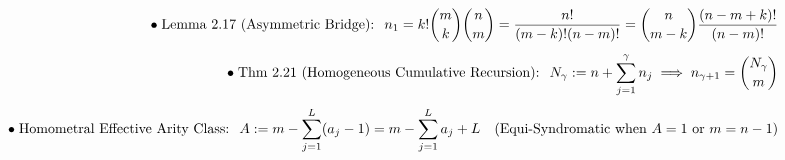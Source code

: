\documentclass[preview]{standalone}
\begin{document}
\begin{align*}
\special{dvisvgm:raw <g id='unique000'>}\bullet\;\text{Lemma 2.17 (Asymmetric Bridge): }\; n_1 = k!\binom{m}{k}\binom{n}{m} = \frac{n!}{(m-k)!(n-m)!} = \binom{n}{m-k}\frac{(n-m+k)!}{(n-m)!}\\[4pt]\bullet\;\text{Thm 2.21 (Homogeneous Cumulative Recursion): }\; N_\gamma := n + \sum_{j=1}^\gamma n_j \implies n_{\gamma+1} = \binom{N_\gamma}{m}\\[4pt]\bullet\;\text{Homometral Effective Arity Class: }\; A := m - \sum_{j=1}^L (a_j - 1) = m - \sum_{j=1}^L a_j + L \quad (\text{Equi-Syndromatic when }A=1\text{ or }m=n-1)\special{dvisvgm:raw </g>}
\end{align*}
\end{document}
